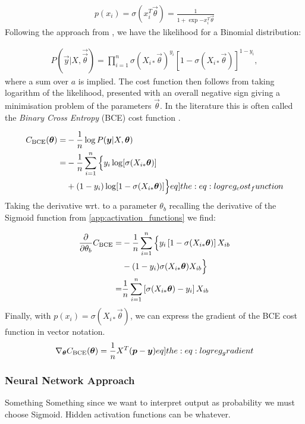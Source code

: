         \begin{align*}
            p(x_i) = \sigma(x_i^T \vec{\theta}) = \frac{1}{1+\exp{-x_i^T\vec{\theta}}}
        \end{align*}
        Following the approach from \cite{Project1}, we have the likelihood for a Binomial distribution:      

        \begin{align*}
            P(\vec{y}|X,\vec{\vec{\theta}}) = \prod_{i = 1}^{n} \sigma(X_{i*}\vec{\theta})^{y_i}[1-\sigma(X_{i*}\vec{\theta})]^{1 - y_i},
        \end{align*}
        where a sum over $a$ is implied. The cost function then follows from taking logarithm of the likelihood, presented with an overall negative sign giving a minimisation problem of the parameters $\vec{\theta}$. In the literature this is often called the \textit{Binary Cross Entropy} (BCE) cost function \cite{BCE}.  

        \begin{align}
            \msub{C}{BCE}(\vec{\theta}) =& - \frac{1}{n} \log P(\vec{y}|X,\vec{\vec{\theta}}) \nonumber \\ \nonumber
            =& - \frac{1}{n} \sum_{i = 1}^{n} \Big\{ y_i \log[\sigma(X_{i*}\vec{\theta})] \\
            &+ (1 - y_i)\log[1-\sigma(X_{i*}\vec{\theta})] \Big\}
            \label[eq]{the:eq:logreg_cost_function}
        \end{align}
        Taking the derivative wrt. to a parameter $\theta_b$ recalling the derivative of the Sigmoid function from \cref{app:activation_functions} we find:

        \begin{align} \nonumber
            \pdv{\theta_b} \msub{C}{BCE} =& - \frac{1}{n} \sum_{i = 1}^{n} \Big\{ y_i \bclosed{1-\sigma(X_{i*}\vec{\theta})}X_{ib} \\ \nonumber
            &- (1-y_i)\sigma(X_{i*}\vec{\theta})X_{ib}  \Big\} \\
            =& \frac{1}{n}\sum_{i=1}^n \bclosed{\sigma(X_{i*}\vec{\theta}) - y_i}X_{ib}
        \end{align}
        Finally, with $p(x_i) = \sigma(X_{i*}\vec{\theta})$, we can express the gradient of the BCE cost function in vector notation.
        \begin{align}
            \nabla_{\vec{\theta}} \msub{C}{BCE}(\vec{\theta}) = \frac{1}{n}X^T (\vec{p} - \vec{y}) 
            \label[eq]{the:eq:logreg_gradient}
        \end{align}


    \subsubsection{Neural Network Approach}
        Something Something since we want to interpret output as probability we must choose Sigmoid. Hidden activation functions can be whatever. 